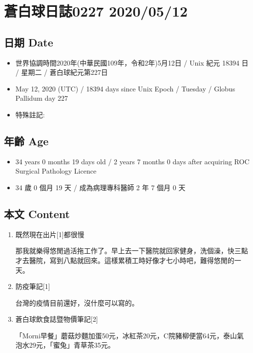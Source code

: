 \documentclass[a5paper, 12pt
]{book}
\providecommand{\tightlist}{%
  \setlength{\itemsep}{0pt}\setlength{\parskip}{0pt}}
\begin{document}
\hypertarget{ux84bcux767dux7403ux65e5ux8a8c0227-20200512}{%
\section{蒼白球日誌0227
2020/05/12}\label{ux84bcux767dux7403ux65e5ux8a8c0227-20200512}}

\hypertarget{ux65e5ux671f-date-72}{%
\subsection{日期 Date}\label{ux65e5ux671f-date-72}}

\begin{itemize}
\tightlist
\item
  世界協調時間2020年(中華民國109年，令和2年)5月12日 / Unix 紀元 18394 日
  / 星期二 / 蒼白球紀元第227日
\item
  May 12, 2020 (UTC) / 18394 days since Unix Epoch / Tuesday / Globus
  Pallidum day 227
\item
  特殊註記:
\end{itemize}

\hypertarget{ux5e74ux9f61-age-72}{%
\subsection{年齡 Age}\label{ux5e74ux9f61-age-72}}

\begin{itemize}
\tightlist
\item
  34 years 0 months 19 days old / 2 years 7 months 0 days after
  acquiring ROC Surgical Pathology Licence
\item
  34 歲 0 個月 19 天 / 成為病理專科醫師 2 年 7 個月 0 天
\end{itemize}

\hypertarget{ux672cux6587-content-72}{%
\subsection{本文 Content}\label{ux672cux6587-content-72}}

\begin{enumerate}
\def\labelenumi{\arabic{enumi}.}
\item
  既然現在出片{[}1{]}都很慢

  那我就樂得悠閒過活拖工作了。早上去一下醫院就回家健身，洗個澡，快三點才去醫院，寫到八點就回來。這樣累積工時好像才七小時吧，難得悠閒的一天。
\item
  防疫筆記{[}1{]}

  台灣的疫情目前還好，沒什麼可以寫的。
\item
  蒼白球飲食誌暨物價筆記{[}2{]}

  「Morni早餐」蘑菇炒麵加蛋50元，冰紅茶20元，C院豬柳便當64元，泰山氣泡水29元，「蜜兔」青草茶35元。
\end{enumerate}
\end{document}

